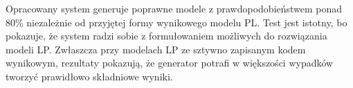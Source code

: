 






Opracowany system generuje poprawne modele z prawdopodobieństwem ponad 80\% niezależnie od przyjętej formy wynikowego modelu PL. %
Test jest istotny, bo pokazuje, że system radzi sobie z formułowaniem możliwych do rozwiązania modeli LP. Zwłaszcza przy modelach LP ze sztywno zapisanym kodem wynikowym, rezultaty pokazują, że generator potrafi w większości wypadków tworzyć prawidłowo składniowe wyniki. %


